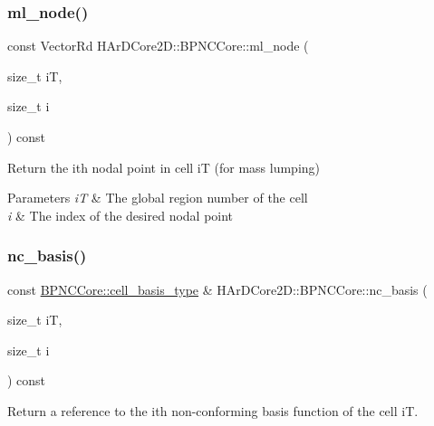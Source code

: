 \subsubsection{\texorpdfstring{ml\+\_\+node()}{ml\_node()}}
{\footnotesize\ttfamily const Vector\+Rd H\+Ar\+D\+Core2\+D\+::\+B\+P\+N\+C\+Core\+::ml\+\_\+node (\begin{DoxyParamCaption}\item[{size\+\_\+t}]{iT,  }\item[{size\+\_\+t}]{i }\end{DoxyParamCaption}) const\hspace{0.3cm}{\ttfamily [inline]}}



Return the i\textquotesingle{}th nodal point in cell iT (for mass lumping) 


\begin{DoxyParams}{Parameters}
{\em iT} & The global region number of the cell \\
\hline
{\em i} & The index of the desired nodal point \\
\hline
\end{DoxyParams}
\mbox{\label{group__BPNC_ga169de49549ae3c009c54c24d72d2e0ec}} 
\subsubsection{\texorpdfstring{nc\+\_\+basis()}{nc\_basis()}}
{\footnotesize\ttfamily const \hyperlink{classHArDCore2D_1_1BPNCCore_a3aa8544d9ea9ae31d70e65aaefb0e9c8}{B\+P\+N\+C\+Core\+::cell\+\_\+basis\+\_\+type} \& H\+Ar\+D\+Core2\+D\+::\+B\+P\+N\+C\+Core\+::nc\+\_\+basis (\begin{DoxyParamCaption}\item[{size\+\_\+t}]{iT,  }\item[{size\+\_\+t}]{i }\end{DoxyParamCaption}) const\hspace{0.3cm}{\ttfamily [inline]}}



Return a reference to the i\textquotesingle{}th non-\/conforming basis function of the cell iT. 

